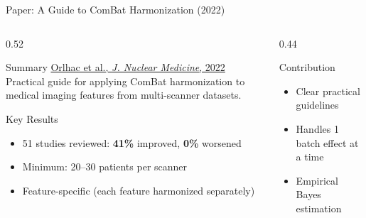 \documentclass[aspectratio=169,xcolor=dvipsnames]{beamer}
\begin{document}
\begin{frame}{Paper: A Guide to ComBat Harmonization (2022)}
    \begin{columns}
        \begin{column}{0.52\textwidth}
            \begin{block}{Summary}
                \small
                \href{https://doi.org/10.2967/jnumed.121.262464}{Orlhac et al., \textit{J. Nuclear Medicine}, 2022}\\[0.3em]
                Practical guide for applying ComBat harmonization to medical imaging features from multi-scanner datasets.
            \end{block}

            \vspace{0.2em}

            \begin{block}{Key Results}
                \small
                \begin{itemize}
                    \item 51 studies reviewed: \textbf{41\%} improved, \textbf{0\%} worsened
                    \item Minimum: 20--30 patients per scanner
                    \item Feature-specific (each feature harmonized separately)
                \end{itemize}
            \end{block}
        \end{column}

        \begin{column}{0.44\textwidth}
            \begin{block}{Contribution}
                \small
                \begin{itemize}
                    \item Clear practical guidelines
                    \item Handles 1 batch effect at a time
                    \item Empirical Bayes estimation
                \end{itemize}
            \end{block}

            \vspace{0.2em}


\end{column}
\end{columns}
\end{frame}
\end{document}
